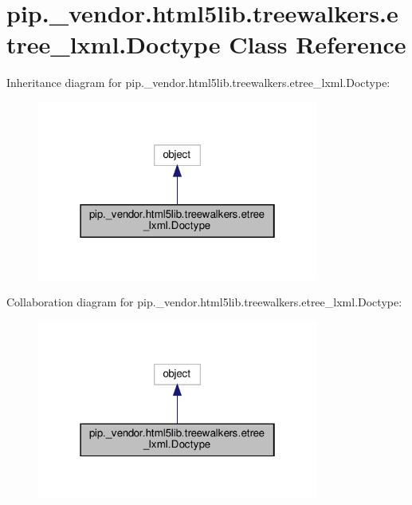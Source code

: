 \hypertarget{classpip_1_1__vendor_1_1html5lib_1_1treewalkers_1_1etree__lxml_1_1Doctype}{}\section{pip.\+\_\+vendor.\+html5lib.\+treewalkers.\+etree\+\_\+lxml.\+Doctype Class Reference}
\label{classpip_1_1__vendor_1_1html5lib_1_1treewalkers_1_1etree__lxml_1_1Doctype}


Inheritance diagram for pip.\+\_\+vendor.\+html5lib.\+treewalkers.\+etree\+\_\+lxml.\+Doctype\+:
\nopagebreak
\begin{figure}[H]
\begin{center}
\leavevmode
\includegraphics[width=262pt]{classpip_1_1__vendor_1_1html5lib_1_1treewalkers_1_1etree__lxml_1_1Doctype__inherit__graph}
\end{center}
\end{figure}


Collaboration diagram for pip.\+\_\+vendor.\+html5lib.\+treewalkers.\+etree\+\_\+lxml.\+Doctype\+:
\nopagebreak
\begin{figure}[H]
\begin{center}
\leavevmode
\includegraphics[width=262pt]{classpip_1_1__vendor_1_1html5lib_1_1treewalkers_1_1etree__lxml_1_1Doctype__coll__graph}
\end{center}
\end{figure}
